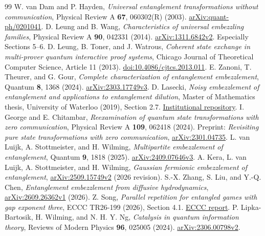 \documentclass[11pt]{article}
\begin{document}
\begin{thebibliography}{99}\small
{} W. van Dam and P. Hayden, \emph{Universal entanglement transformations without communication}, Physical Review A \textbf{67}, 060302(R) (2003). \href{https://arxiv.org/abs/quant-ph/0201041}{arXiv:quant-ph/0201041}.
 D. Leung and B. Wang, \emph{Characteristics of universal embezzling families}, Physical Review A \textbf{90}, 042331 (2014). \href{https://arxiv.org/abs/1311.6842}{arXiv:1311.6842v2}. Especially Sections 5--6.
 D. Leung, B. Toner, and J. Watrous, \emph{Coherent state exchange in multi-prover quantum interactive proof systems}, Chicago Journal of Theoretical Computer Science, Article 11 (2013). \href{https://doi.org/10.4086/cjtcs.2013.011}{doi:10.4086/cjtcs.2013.011}.
 E. Zanoni, T. Theurer, and G. Gour, \emph{Complete characterization of entanglement embezzlement}, Quantum \textbf{8}, 1368 (2024). \href{https://arxiv.org/abs/2303.17749}{arXiv:2303.17749v3}.
 D. Lasecki, \emph{Noisy embezzlement of entanglement and applications to entanglement dilution}, Master of Mathematics thesis, University of Waterloo (2019), Section 2.7. \href{https://uwspace.uwaterloo.ca/bitstreams/fad1b354-e7b6-49be-9cfd-0f97c0055d4f/download}{Institutional repository}.
 I. George and E. Chitambar, \emph{Reexamination of quantum state transformations with zero communication}, Physical Review A \textbf{109}, 062418 (2024). Preprint: \emph{Revisiting pure state transformations with zero communication}, \href{https://arxiv.org/abs/2301.04735}{arXiv:2301.04735}.
 L. van Luijk, A. Stottmeister, and H. Wilming, \emph{Multipartite embezzlement of entanglement}, Quantum \textbf{9}, 1818 (2025). \href{https://arxiv.org/abs/2409.07646}{arXiv:2409.07646v3}.
 A. Kera, L. van Luijk, A. Stottmeister, and H. Wilming, \emph{Gaussian fermionic embezzlement of entanglement}, \href{https://arxiv.org/abs/2509.15749}{arXiv:2509.15749v2} (2026 revision).
 S.-X. Zhang, S. Liu, and Y.-Q. Chen, \emph{Entanglement embezzlement from diffusive hydrodynamics}, \href{https://arxiv.org/abs/2609.26362}{arXiv:2609.26362v1} (2026).
 Z. Song, \emph{Parallel repetition for entangled games with gap exponent three}, ECCC TR26-199 (2026), Section 4.1. \href{https://eccc.weizmann.ac.il/report/2026/199/download}{ECCC report}.
 P. Lipka-Bartosik, H. Wilming, and N. H. Y. Ng, \emph{Catalysis in quantum information theory}, Reviews of Modern Physics \textbf{96}, 025005 (2024). \href{https://arxiv.org/abs/2306.00798}{arXiv:2306.00798v2}.
\end{thebibliography}
\end{document}
